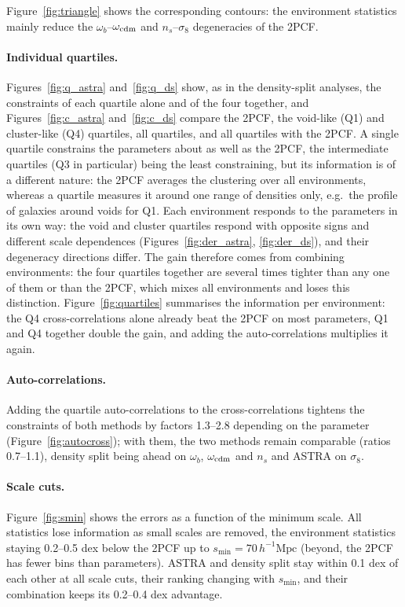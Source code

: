\documentclass[11pt,twocolumn]{article}
\newcommand{\Mpch}{\,h^{-1}\mathrm{Mpc}}
\begin{document}
Figure~\ref{fig:triangle} shows the corresponding contours: the environment statistics mainly reduce the $\omega_b$--$\omega_{\rm cdm}$ and $n_s$--$\sigma_8$ degeneracies of the 2PCF.

\paragraph{Individual quartiles.} Figures~\ref{fig:q_astra} and~\ref{fig:q_ds} show, as in the density-split analyses, the constraints of each quartile alone and of the four together, and Figures~\ref{fig:c_astra} and~\ref{fig:c_ds} compare the 2PCF, the void-like (Q1) and cluster-like (Q4) quartiles, all quartiles, and all quartiles with the 2PCF. A single quartile constrains the parameters about as well as the 2PCF, the intermediate quartiles (Q3 in particular) being the least constraining, but its information is of a different nature: the 2PCF averages the clustering over all environments, whereas a quartile measures it around one range of densities only, e.g.\ the profile of galaxies around voids for Q1. Each environment responds to the parameters in its own way: the void and cluster quartiles respond with opposite signs and different scale dependences (Figures~\ref{fig:der_astra}, \ref{fig:der_ds}), and their degeneracy directions differ. The gain therefore comes from combining environments: the four quartiles together are several times tighter than any one of them or than the 2PCF, which mixes all environments and loses this distinction. Figure~\ref{fig:quartiles} summarises the information per environment: the Q4 cross-correlations alone already beat the 2PCF on most parameters, Q1 and Q4 together double the gain, and adding the auto-correlations multiplies it again.

\paragraph{Auto-correlations.} Adding the quartile auto-correlations to the cross-correlations tightens the constraints of both methods by factors 1.3--2.8 depending on the parameter (Figure~\ref{fig:autocross}); with them, the two methods remain comparable (ratios 0.7--1.1), density split being ahead on $\omega_b$, $\omega_{\rm cdm}$ and $n_s$ and ASTRA on $\sigma_8$.

\paragraph{Scale cuts.} Figure~\ref{fig:smin} shows the errors as a function of the minimum scale. All statistics lose information as small scales are removed, the environment statistics staying 0.2--0.5 dex below the 2PCF up to $s_{\min}=70\Mpch$ (beyond, the 2PCF has fewer bins than parameters). ASTRA and density split stay within 0.1 dex of each other at all scale cuts, their ranking changing with $s_{\min}$, and their combination keeps its 0.2--0.4 dex advantage.
\end{document}
